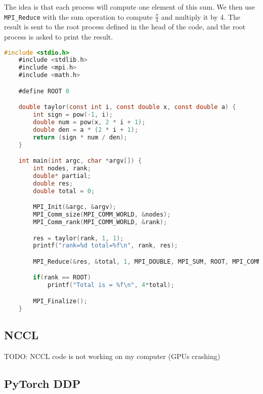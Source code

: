 The idea is that each process will compute one element of this sum. We then use \lstinline{MPI_Reduce} with the sum operation to compute \(\frac{\pi}{4}\) and multiply it by 4. The result is sent to the root process defined in the head of the code, and the root process is asked to print the result.

\begin{lstlisting}[language=C]
    #include <stdio.h>
    #include <stdlib.h>
    #include <mpi.h>
    #include <math.h>

    #define ROOT 0

    double taylor(const int i, const double x, const double a) {
        int sign = pow(-1, i);
        double num = pow(x, 2 * i + 1);
        double den = a * (2 * i + 1);
        return (sign * num / den);
    }

    int main(int argc, char *argv[]) {
        int nodes, rank;
        double* partial;
        double res;
        double total = 0;

        MPI_Init(&argc, &argv);
        MPI_Comm_size(MPI_COMM_WORLD, &nodes);
        MPI_Comm_rank(MPI_COMM_WORLD, &rank);

        res = taylor(rank, 1, 1);
        printf("rank=%d total=%f\n", rank, res);

        MPI_Reduce(&res, &total, 1, MPI_DOUBLE, MPI_SUM, ROOT, MPI_COMM_WORLD);

        if(rank == ROOT)
            printf("Total is = %f\n", 4*total);

        MPI_Finalize();
    }
\end{lstlisting}

\subsection{NCCL}
TODO: NCCL code is not working on my computer (GPUs crashing)

\subsection{PyTorch DDP}
